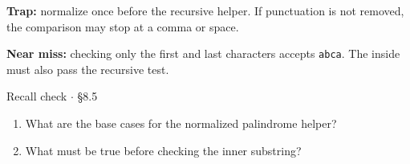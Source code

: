 \documentclass[11pt]{article}
\begin{document}
\begin{keepsection}
\begin{notebox}\textbf{Trap:} normalize once before the recursive helper. If punctuation is not removed, the comparison may stop at a comma or space.\end{notebox}

\begin{notebox}\textbf{Near miss:} checking only the first and last characters accepts \texttt{abca}. The inside must also pass the recursive test.\end{notebox}

\begin{recallbox}{Recall check \ensuremath{\cdot} §8.5}
\begin{enumerate}
\item What are the base cases for the normalized palindrome helper?
\item What must be true before checking the inner substring?
\end{enumerate}

\end{recallbox}
\end{keepsection}
\end{document}

